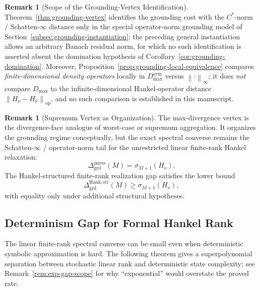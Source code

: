 \documentclass[12pt]{article}
\theoremstyle{definition}
\newtheorem{remark}[theorem]{Remark}
\newcommand{\norm}[1]{\left\lVert#1\right\rVert}
\newcommand{\Dunres}{\Delta_{\mathrm{grd}}^{\mathrm{unres}}}
\newcommand{\DHankstr}{\Delta_{\mathrm{grd}}^{\mathrm{Hank,str}}}
\newcommand{\Dmax}{D_{\max}}
\newcommand{\Dmaxsym}{D_{\max}^{\mathrm{sym}}}
\begin{document}
\begin{remark}[Scope of the Grounding-Vertex Identification]
\label{rem:grounding-vertex-scope}
Theorem~\ref{thm:grounding-vertex} identifies the grounding cost with the
$C^*$-norm / Schatten-$\infty$ distance only in the special operator-norm
grounding model of Section~\ref{subsec:grounding-instantiation}; the
preceding general instantiation allows an arbitrary Banach residual norm, for
which no such identification is asserted absent the domination hypothesis of
Corollary~\ref{cor:grounding-domination}.  Moreover,
Proposition~\ref{prop:grounding-local-equivalence} compares
\emph{finite-dimensional density operators} locally in $\Dmaxsym$ versus
$\norm{\cdot}_\infty$; it does \emph{not} compare $\Dmax$ to the
infinite-dimensional Hankel-operator distance
$\norm{H_\nu-H_{\widehat\nu}}_{\mathrm{op}}$, and no such comparison is
established in this manuscript.
\end{remark}

\begin{remark}[Supremum Vertex as Organization]
\label{rem:grounding-supremum-organization}
The max-divergence vertex is the divergence-face analogue of worst-case or
supremum aggregation.  It organizes the grounding regime conceptually, but the
exact spectral converse remains the Schatten-$\infty$ / operator-norm tail for
the unrestricted linear finite-rank Hankel relaxation:
\[
\Dunres(M)
=
\sigma_{M+1}(H_\nu).
\]
The Hankel-structured finite-rank realization gap satisfies the lower bound
\[
\DHankstr(M)
\ge
\sigma_{M+1}(H_\nu),
\]
with equality only under additional structural hypotheses.
\end{remark}

\subsection{Determinism Gap for Formal Hankel Rank}
\label{subsec:exp-determinism}

The linear finite-rank spectral converse can be small even when deterministic
symbolic approximation is hard.  The following theorem gives a
superpolynomial separation between stochastic linear rank and deterministic
state complexity; see Remark~\ref{rem:exp-gap-scope} for why ``exponential''
would overstate the proved rate.
\end{document}
